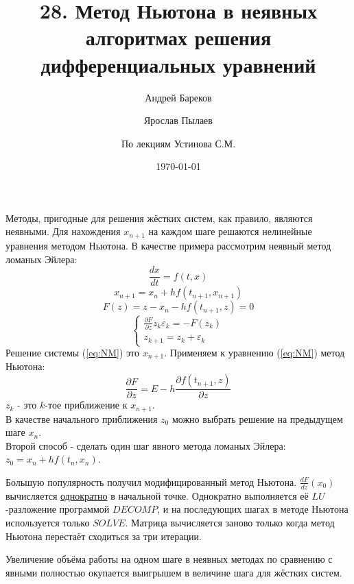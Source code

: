 \documentclass[a4paper,11pt]{article}
\title{28. Метод Ньютона в неявных алгоритмах решения дифференциальных уравнений}
\author{Андрей Бареков \and Ярослав Пылаев \and По лекциям Устинова С.М.}
\date{\today}
\begin{document}
\maketitle
\newpage

Методы, пригодные для решения жёстких систем, как правило, являются неявными. Для нахождения $x_{n+1}$ на каждом шаге решаются нелинейные уравнения методом Ньютона.
  В качестве примера рассмотрим неявный метод ломаных Эйлера:
\begin{equation}
  \frac{dx}{dt} = f(t, x)  
\end{equation}
\[x_{n+1} = x_n + hf(t_{n+1}, x_{n+1})\]
\[F(z) = z - x_n - hf(t_{n+1}, z) = 0\]
\begin{equation}
  \begin{cases}
    \frac{\partial F}{\partial z}z_k \varepsilon_k = -F(z_k) \\
    z_{k+1} = z_k + \varepsilon_k
  \end{cases}
  \label{eq:NM}
\end{equation}
Решение системы (\ref{eq:NM}) это $x_{n+1}$. Применяем к уравнению (\ref{eq:NM}) метод Ньютона:
\[\frac{\partial F}{\partial z} = E - h\frac{\partial f(t_{n+1}, z)}{\partial z}\]
$z_k$ - это $k$-тое приближение к $x_{n+1}$. \\
В качестве начального приближения $z_0$ можно выбрать решение на предыдущем шаге $x_n$. \\
Второй способ - сделать один шаг явного метода ломаных Эйлера: $z_0 = x_n + hf(t_n, x_n)$. \\
\begin{importantblock}
  Большую популярность получил модифицированный метод Ньютона. $\frac{dF}{dz}(x_0)$ вычисляется \underline{однократно} в начальной точке. Однократно
    выполняется её $LU$-разложение программой $DECOMP$, и на последующих шагах в методе Ньютона используется только $SOLVE$. Матрица вычисляется заново
    только когда метод Ньютона перестаёт сходиться за три итерации.
\end{importantblock}
Увеличение объёма работы на одном шаге в неявных методах по сравнению с явными полностью окупается выигрышем в величине шага для жёстких систем.
\end{document}
